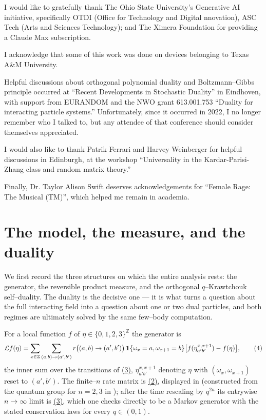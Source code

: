 \documentclass[11pt]{article}
\theoremstyle{plain}
\theoremstyle{definition}
\theoremstyle{remark}
\newcommand{\Z}{\mathbb{Z}}\newcommand{\R}{\mathbb{R}}\newcommand{\N}{\mathbb{N}}
\newcommand{\cL}{\mathcal L}\newcommand{\cO}{\mathcal O}\newcommand{\cE}{\mathcal E}
\begin{document}
I would like to gratefully thank The Ohio State University's Generative AI initiative, specifically OTDI (Office for Technology and Digital nnovation), ASC Tech (Arts and Sciences Technology); and The Ximera Foundation for providing a Claude Max subscription.

I acknowledge that some of this work was done on devices belonging to Texas A\&M University.

Helpful discussions about orthogonal polynomial duality and Boltzmann–Gibbs principle occurred at ``Recent Developments in Stochastic Duality'' in Eindhoven, with support from EURANDOM and the NWO grant 613.001.753 ``Duality for interacting particle systems.'' Unfortunately, since it occurred in 2022, I no longer remember who I talked to, but any attendee of that conference should consider themselves appreciated.
 
I would also like to thank Patrik Ferrari and Harvey Weinberger for helpful discussions in Edinburgh, at the workshop ``Universality in the Kardar-Parisi-Zhang class and random matrix theory.''

Finally, Dr. Taylor Alison Swift deserves acknowledgements for ``Female Rage: The Musical (TM)'', which helped me remain in academia. 



\section{The model, the measure, and the duality}\label{sec_model}

We first record the three structures on which the entire analysis rests: the generator,
the reversible product measure, and the orthogonal $q$--Krawtchouk self--duality. The
duality is the decisive one --- it is what turns a question about the full interacting
field into a question about one or two dual particles, and both regimes are ultimately
solved by the same few--body computation.

For a local function $f$ of $\eta\in\{0,1,2,3\}^\Z$ the generator is
\label{eq_gen}
\begin{equation}
  \cL f(\eta)=\sum_{x\in\Z}\sum_{(a,b)\to(a',b')}
   r\big((a,b)\to(a',b')\big)\,\bone\{\omega_x=a,\omega_{x+1}=b\}
   \big[f(\eta^{x,x+1}_{a'b'})-f(\eta)\big],\qquad(4)
\end{equation}
the inner sum over the transitions of \hyperref[eq_rates]{(3)}, $\eta^{x,x+1}_{a'b'}$ denoting
$\eta$ with $(\omega_x,\omega_{x+1})$ reset to $(a',b')$. The finite--$n$ rate matrix
is \hyperref[eq_nrates]{(2)}, displayed in \cite[\S2.1]{REU} (constructed from the quantum
group for $n=2,3$ in \cite{KLLPZ}); after the time rescaling by $q^{2n}$ its entrywise
$n\to\infty$ limit is \hyperref[eq_rates]{(3)}, which one checks directly to be a Markov
generator with the stated conservation laws for every $q\in(0,1)$.
\end{document}
